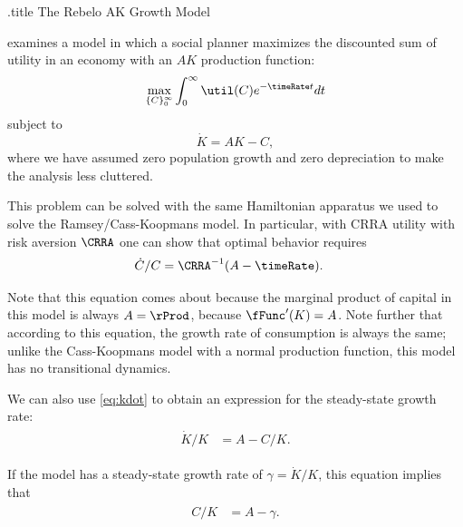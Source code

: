 \documentclass{handout}
\begin{document}
\handoutHeader

\begin{verbatimwrite}{\jobname.title}
The Rebelo AK Growth Model
\end{verbatimwrite}

\handoutNameMake



\cite{rebelo:long} examines a model in which a social planner maximizes the discounted sum of utility
in an economy with an $AK$ production function:
\begin{equation}
  \label{eq:maxutil}
  \max_{\{C\}_{0}^{\infty}} \int_0^{\infty} \util(C) e^{-\timeRate t} dt
\end{equation}
subject to
\begin{equation}
  \label{eq:kdot}
  \dot{K} = AK - C,
\end{equation}
where we have assumed zero population growth and zero depreciation
to make the analysis less cluttered.

This problem can be solved with the same Hamiltonian apparatus we used
to solve the Ramsey/Cass-Koopmans model.  In particular, with CRRA
utility with risk aversion $\CRRA$ one can show that optimal behavior
requires
\begin{equation}\begin{gathered}\begin{aligned}
  \label{eq:cgrow}
  \dot{C}/C & =  \CRRA^{-1}(A - \timeRate).
\end{aligned}\end{gathered}\end{equation}

Note that this equation comes about because the marginal product of
capital in this model is always $A = \rProd$, because $\fFunc^{\prime}(K) = A$.  Note 
further that according to this equation, the growth rate of consumption
is always the same; unlike the Cass-Koopmans model with a normal
production function, this model has no transitional dynamics.

We can also use \eqref{eq:kdot} to obtain an expression for the
steady-state growth rate:
\begin{equation}\begin{gathered}\begin{aligned}
  \label{eq:ssg}
  \dot{K}/K & =  A - C/K.
\end{aligned}\end{gathered}\end{equation}

If the model has a steady-state growth rate of $\gamma = \dot{K}/K$,
this equation implies that
\begin{equation}\begin{gathered}\begin{aligned}
  \label{eq:1}
  C/K & =  A - \gamma.
\end{aligned}\end{gathered}\end{equation}
\end{document}
